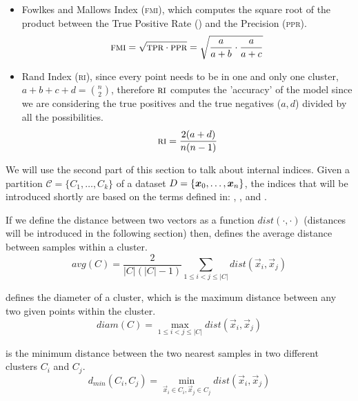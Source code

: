 \begin{itemize}
	\item Fowlkes and Mallows Index (\textsc{fmi})\cite{Fowlkes1983}, which computes the square root of the
		product between the True Positive Rate (\tpr) and the Precision (\textsc{ppr}).
		\begin{equation*}
			\textsc{fmi} = \sqrt{\textsc{tpr} \cdot \textsc{ppr}} = \sqrt{\frac{a}{a + b} \cdot \frac{a}{a + c}}
		\end{equation*}
	\item Rand Index (\textsc{ri})\cite{Rand1971}, since every point needs to be in one and
		only one cluster, $a + b + c + d = \binom{n}{2}$, therefore $\textsc{ri}$ computes
		the 'accuracy' of the model since we are considering the true positives and the true negatives ($a, d$) divided by all the possibilities.
		\begin{equation*}
			\textsc{ri} = \frac{2(a + d)}{n(n - 1)}
		\end{equation*}
\end{itemize}

We will use the second part of this section to talk about internal indices. Given a partition
$\mathcal{C} = \{C_1, \ldots, C_k\}$ of a dataset $D = \{\boldsymbol{x}_0, \allowbreak\ldots\allowbreak, \boldsymbol{x}_n\}$, the indices that will
be introduced shortly are based on the terms defined in: , ,
 and .

If we define the distance between two vectors as a function $dist(\cdot, \cdot)$ (distances will be
introduced in the following section) then,  defines the average distance between samples within a cluster.
\begin{equation}
	\label{eq:cluster-avg}
	avg(C) = \frac{2}{|C|(|C| - 1)}\sum_{1 \leq i < j \leq |C|} dist(\vec{x}_i, \vec{x}_j)
\end{equation}

 defines the diameter of a cluster, which is the maximum distance between any
two given points within the cluster.
\begin{equation}
	\label{eq:cluster-diam}
	diam(C) = \max_{1 \leq i < j \leq |C|} dist(\vec{x}_i, \vec{x}_j)
\end{equation}

 is the minimum distance between the two nearest samples in two
different clusters $C_i$ and $C_j$.
\begin{equation}
	\label{eq:inter-cluster-distance}
	d_{min}(C_i, C_j) = \min_{\vec{x}_i \in C_i, \vec{x}_j \in C_j} dist(\vec{x}_i, \vec{x}_j)
\end{equation}

